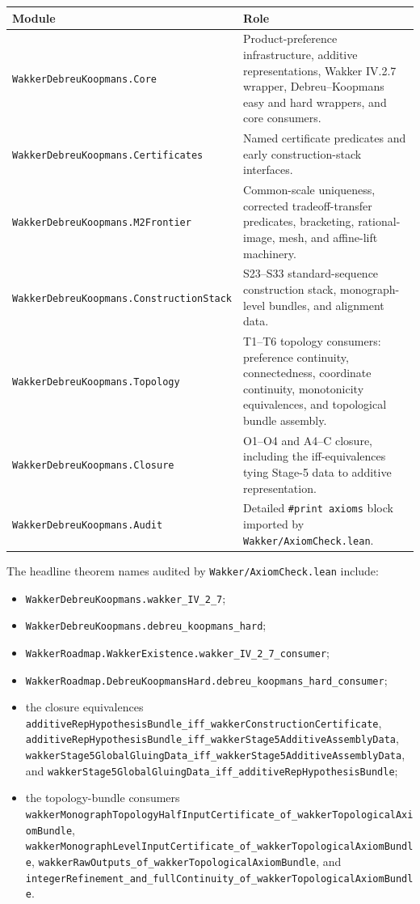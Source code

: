 \documentclass[11pt,english]{article}
\begin{document}
\begin{center}
\begin{tabular}{@{}p{}p{}@{}}
\toprule
Module & Role \\
\midrule
\texttt{WakkerDebreuKoopmans.Core} & Product-preference infrastructure, additive representations, Wakker IV.2.7 wrapper, Debreu--Koopmans easy and hard wrappers, and core consumers. \\
\texttt{WakkerDebreuKoopmans.Certificates} & Named certificate predicates and early construction-stack interfaces. \\
\texttt{WakkerDebreuKoopmans.M2Frontier} & Common-scale uniqueness, corrected tradeoff-transfer predicates, bracketing, rational-image, mesh, and affine-lift machinery. \\
\texttt{WakkerDebreuKoopmans.ConstructionStack} & S23--S33 standard-sequence construction stack, monograph-level bundles, and alignment data. \\
\texttt{WakkerDebreuKoopmans.Topology} & T1--T6 topology consumers: preference continuity, connectedness, coordinate continuity, monotonicity equivalences, and topological bundle assembly. \\
\texttt{WakkerDebreuKoopmans.Closure} & O1--O4 and A4--C closure, including the iff-equivalences tying Stage-5 data to additive representation. \\
\texttt{WakkerDebreuKoopmans.Audit} & Detailed \texttt{\#print axioms} block imported by \texttt{Wakker/AxiomCheck.lean}. \\
\bottomrule
\end{tabular}
\end{center}

The headline theorem names audited by \texttt{Wakker/AxiomCheck.lean} include:
\begin{itemize}[leftmargin=*]
\item \texttt{WakkerDebreuKoopmans.wakker\_IV\_2\_7};
\item \texttt{WakkerDebreuKoopmans.debreu\_koopmans\_hard};
\item \texttt{WakkerRoadmap.WakkerExistence.wakker\_IV\_2\_7\_consumer};
\item \texttt{WakkerRoadmap.DebreuKoopmansHard.debreu\_koopmans\_hard\_consumer};
\item the closure equivalences \texttt{additiveRepHypothesisBundle\_iff\_wakkerConstructionCertificate}, \texttt{additiveRepHypothesisBundle\_iff\_wakkerStage5AdditiveAssemblyData}, \texttt{wakkerStage5GlobalGluingData\_iff\_wakkerStage5AdditiveAssemblyData}, and \texttt{wakkerStage5GlobalGluingData\_iff\_additiveRepHypothesisBundle};
\item the topology-bundle consumers \texttt{wakkerMonographTopologyHalfInputCertificate\_of\_wakkerTopologicalAxiomBundle}, \texttt{wakkerMonographLevelInputCertificate\_of\_wakkerTopologicalAxiomBundle}, \texttt{wakkerRawOutputs\_of\_wakkerTopologicalAxiomBundle}, and \texttt{integerRefinement\_and\_fullContinuity\_of\_wakkerTopologicalAxiomBundle}.
\end{itemize}
\end{document}
